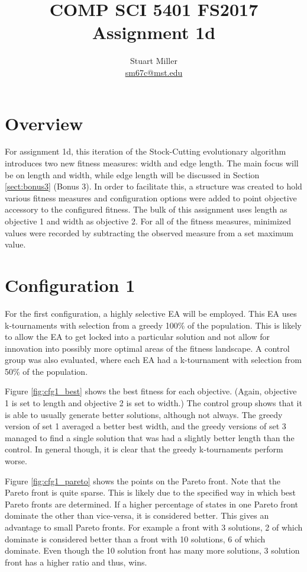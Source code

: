 \documentclass[11pt]{article}
\begin{document}
\title{COMP SCI 5401 FS2017 Assignment 1d}
\author{Stuart Miller\\\href{mailto:sm67c@mst.edu}{sm67c@mst.edu}}
\maketitle


\section{Overview}\label{sect:overview}

For assignment 1d, this iteration of the Stock-Cutting evolutionary algorithm introduces two new fitness measures: width and edge length. The main focus will be on length and width, while edge length will be discussed in Section \ref{sect:bonus3} (Bonus 3).
In order to facilitate this, a structure was created to hold various fitness measures and configuration options were added to point objective accessory to the configured fitness. The bulk of this assignment uses length as objective 1 and width as objective 2. For all of the fitness measures, minimized values were recorded by subtracting the observed measure from a set maximum value.

\section{Configuration 1}\label{sect:cfg1}

For the first configuration, a highly selective EA will be employed. This EA uses k-tournaments with selection from a greedy 100\% of the population. This is likely to allow the EA to get locked into a particular solution and not allow for innovation into possibly more optimal areas of the fitness landscape. A control group was also evaluated, where each EA had a k-tournament with selection from 50\% of the population.

Figure \ref{fig:cfg1_best} shows the best fitness for each objective. (Again, objective 1 is set to length and objective 2 is set to width.) The control group shows that it is able to usually generate better solutions, although not always. The greedy version of set 1 averaged a better best width, and the greedy versions of set 3 managed to find a single solution that was had a slightly better length than the control. In general though, it is clear that the greedy k-tournaments perform worse.

Figure \ref{fig:cfg1_pareto} shows the points on the Pareto front. Note that the Pareto front is quite sparse. This is likely due to the specified way in which best Pareto fronts are determined. If a higher percentage of states in one Pareto front dominate the other than vice-versa, it is considered better. This gives an advantage to small Pareto fronts. For example a front with 3 solutions, 2 of which dominate is considered better than a front with 10 solutions, 6 of which dominate. Even though the 10 solution front has many more solutions, 3 solution front has a higher ratio and thus, wins.
\end{document}
